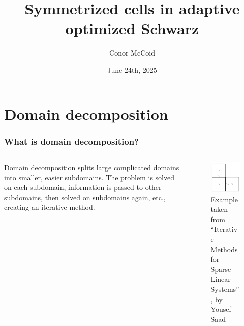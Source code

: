 \documentclass{beamer}
\title{Symmetrized cells in adaptive optimized Schwarz}
\author{Conor McCoid}
\institute{McMaster University}
\date{June 24th, 2025}
\begin{document}
\maketitle

\section{Domain decomposition}

\begin{frame}
\frametitle{What is domain decomposition?}

\begin{columns}
	\begin{column}{0.5\textwidth}
		Domain decomposition splits large complicated domains into smaller, easier subdomains.
		The problem is solved on each subdomain, information is passed to other subdomains, then solved on subdomains again, etc., creating an iterative method.
	\end{column}
	\begin{column}{0.5\textwidth}
		\begin{figure}
			\centering
			\includegraphics[width=\textwidth]{FIG/Saad_Lshape_domains.png}
			\caption{Example taken from ``Iterative Methods for Sparse Linear Systems'', by Yousef Saad}
		\end{figure}
	\end{column}
\end{columns}
\end{frame}
\end{document}
